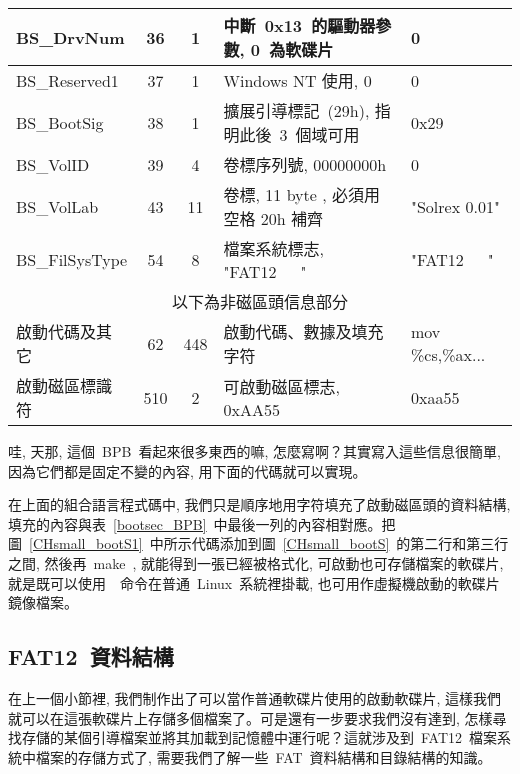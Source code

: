 {\begin{center}
\begin{longtable}{lccll}
\hline
BS\_DrvNum      & 36 &  1 & 中斷~0x13~的驅動器參數, 0~為軟碟片        & 0\\
\hline
BS\_Reserved1   & 37 &  1 & Windows NT 使用, 0                      & 0\\
\hline
BS\_BootSig     & 38 &  1 & 擴展引導標記~(29h), 指明此後~3~個域可用 & 0x29\\
\hline
BS\_VolID       & 39 &  4 & 卷標序列號, 00000000h                   & 0\\
\hline
BS\_VolLab      & 43 & 11 & 卷標, 11  byte , 必須用空格 20h 補齊      & "Solrex 0.01"\\
\hline
BS\_FilSysType  & 54 &  8 & 檔案系統標志, "FAT12~~~"                & "FAT12~~~"\\
\hline
\multicolumn{5}{c}{以下為非磁區頭信息部分}\\
\hline
啟動代碼及其它  & 62 & 448 & 啟動代碼、數據及填充字符               & mov \%cs,\%ax...\\
\hline
啟動磁區標識符  & 510 &  2 & 可啟動磁區標志, 0xAA55                 & 0xaa55\\
\hline
\end{longtable}\end{center}
}

哇, 天那, 這個~BPB~看起來很多東西的嘛, 怎麼寫啊？其實寫入這些信息很簡單, 因為它們都是固定不變的內容, 用下面的代碼就可以實現。

\label{CHsmall_bootS1}

在上面的組合語言程式碼中, 我們只是順序地用字符填充了啟動磁區頭的資料結構, 填充的內容與表~\ref{bootsec_BPB}~中最後一列的內容相對應。把圖~\ref{CHsmall_bootS1}~中所示代碼添加到圖~\ref{CHsmall_bootS}~的第二行和第三行之間, 然後再~make~, 就能得到一張已經被格式化, 可啟動也可存儲檔案的軟碟片, 就是既可以使用~~命令在普通~Linux~系統裡掛載, 也可用作虛擬機啟動的軟碟片鏡像檔案。

\subsection{FAT12~資料結構}

在上一個小節裡, 我們制作出了可以當作普通軟碟片使用的啟動軟碟片, 這樣我們就可以在這張軟碟片上存儲多個檔案了。可是還有一步要求我們沒有達到, 怎樣尋找存儲的某個引導檔案並將其加載到記憶體中運行呢？這就涉及到~FAT12~檔案系統中檔案的存儲方式了, 需要我們了解一些~FAT~資料結構和目錄結構的知識。

